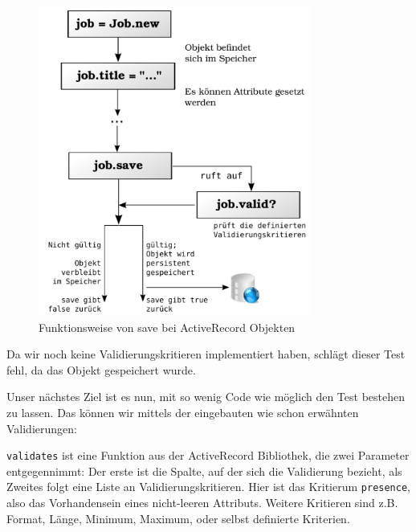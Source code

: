 \begin{figure}[hbp]
 \centering
 \includegraphics[width=0.8\textwidth]{./diagrams/activerecord-save.pdf}
 \caption{Funktionsweise von save bei ActiveRecord Objekten}
 \label{fig:activerecordsave}
\end{figure}

Da wir noch keine Validierungskritieren implementiert haben, schlägt dieser Test fehl, da das Objekt gespeichert wurde.

Unser nächstes Ziel ist es nun, mit so wenig Code wie möglich den Test bestehen zu lassen. Das können wir mittels der eingebauten wie schon erwähnten Validierungen:

\begin{ruby}[label=app/models/job.rb]
   
      
\end{ruby}
\texttt{validates} ist eine Funktion aus der ActiveRecord Bibliothek, die zwei Parameter entgegennimmt: Der erste ist die Spalte, auf der sich die Validierung bezieht, als Zweites folgt eine Liste an Validierungskritieren. Hier ist das Kritierum \texttt{presence}, also das Vorhandensein eines nicht-leeren Attributs. Weitere Kritieren sind z.B. Format, Länge, Minimum, Maximum, oder selbst definierte Kriterien.

